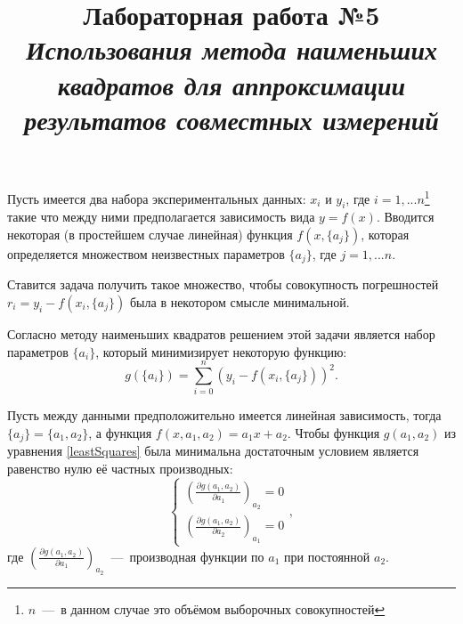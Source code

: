 \documentclass[14pt,a4paper]{article}
\title{Лабораторная работа №5 \\ \textit{Использования метода наименьших квадратов для аппроксимации результатов совместных измерений}}
\begin{document}
\maketitle
Пусть имеется два набора экспериментальных данных: $x_{i}$ и $y_{i}$, где ${i=1,...n}$\footnote{$n$~---~в данном случае это объёмом выборочных совокупностей} такие что между ними предполагается зависимость вида $y = f(x)$. 
Вводится некоторая (в простейшем случае линейная) функция $f(x, \{a_j\})$, которая определяется множеством неизвестных параметров $\{a_j\}$, где $j={1,...n}$.

Ставится задача получить такое множество, чтобы совокупность погрешностей $r_i=y_i-f(x_i, \{a_j\})$ была в некотором смысле минимальной.

Согласно методу наименьших квадратов решением этой задачи является набор параметров $\{a_i\}$, который минимизирует некоторую функцию:
\begin{equation} \label{leastSquares}
    g(\{a_i\}) = \sum\limits^n_{i=0} (y_i-f(x_i, \{a_j\}))^2.
\end{equation}

Пусть между данными предположительно имеется линейная зависимость, тогда $\{a_j\} = \{a_1,a_2\}$, а функция $f(x, a_1, a_2) = a_1x + a_2$. Чтобы функция $g(a_1,a_2)$ из уравнения \ref{leastSquares} была минимальна достаточным условием является равенство нулю её частных производных:
\begin{equation}
    \begin{cases}
        \left (\frac{\partial g(a_1,a_2)}{\partial a_1} \right )_{a_2} = 0 \\
        \left (\frac{\partial g(a_1,a_2)}{\partial a_2} \right )_{a_1} = 0
    \end{cases},
\end{equation}
где $\left (\frac{\partial g(a_1,a_2)}{\partial a_1} \right )_{a_2}$~---~производная функции по $a_1$ при постоянной $a_2$.

\progress{}
\end{document}
